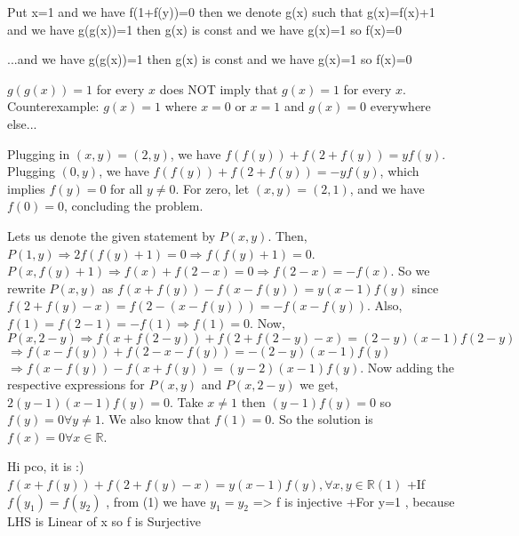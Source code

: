 \begin{solution}
	Put x=1 and we have f(1+f(y))=0 then we denote  g(x) such that g(x)=f(x)+1 and we have g(g(x))=1 then g(x) is const  and we have g(x)=1 so f(x)=0
\end{solution}



\begin{solution}
	\begin{tcolorbox}...and we have g(g(x))=1 then g(x) is const  and we have g(x)=1 so f(x)=0\end{tcolorbox}
$g(g(x))=1$ for every $x$ does NOT imply that $g(x)=1$ for every $x$.
Counterexample:
$g(x)=1$ where $x=0$ or $x=1$ and $g(x)=0$ everywhere else...
\end{solution}



\begin{solution}
	Plugging in $(x,y) = (2,y)$, we have $f(f(y))+f(2+f(y)) = yf(y)$. Plugging $(0,y)$, we have $f(f(y))+f(2+f(y)) = -yf(y)$, which implies $f(y) = 0$ for all $y \ne 0$. For zero, let $(x,y) = (2,1)$, and we have $f(0)=0$, concluding the problem.
\end{solution}



\begin{solution}
	Lets us denote the given statement by $P(x,y)$. Then,
$P(1,y)\Rightarrow 2f(f(y)+1)=0\Rightarrow f(f(y)+1)=0$.
$P(x,f(y)+1)\Rightarrow f(x)+f(2-x)=0\Rightarrow f(2-x)=-f(x)$.
So we rewrite $P(x,y)$ as $f(x+f(y))-f(x-f(y))=y(x-1)f(y)$ since $f(2+f(y)-x)=f(2-(x-f(y)))=-f(x-f(y))$.
Also, $f(1)=f(2-1)=-f(1)\Rightarrow f(1)=0$. Now,
$P(x,2-y)\Rightarrow f(x+f(2-y))+f(2+f(2-y)-x)=(2-y)(x-1)f(2-y)$
$\Rightarrow f(x-f(y))+f(2-x-f(y))=-(2-y)(x-1)f(y)$
$\Rightarrow f(x-f(y))-f(x+f(y))=(y-2)(x-1)f(y)$. 
Now adding the respective expressions for $P(x,y)$ and $P(x,2-y)$ we get,
$2(y-1)(x-1)f(y)=0$. Take $x\neq 1$ then $(y-1)f(y)=0$ so $f(y)=0\forall y\neq 1$. We also know that $f(1)=0$. So the solution is $f(x)=0\forall x\in \mathbb{R}$.
\end{solution}



\begin{solution}
	Hi pco, it is :)
$ f(x+f(y))+f(2+f(y)-x)=y(x-1)f(y),\forall x,y\in\mathbb{R}(1) $
+If $ f(y_{1})=f(y_{2}) $ , from (1) we have $ y_{1}=y_{2} $ => f is injective
+For y=1 , because LHS is Linear of x so f is Surjective
\end{solution}



